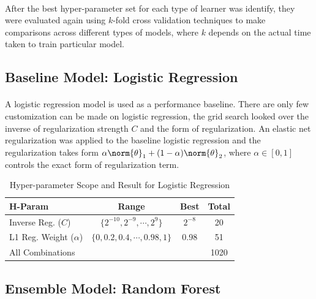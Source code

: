 \documentclass[11pt]{article}
\begin{document}
	 \paragraph{} After the best hyper-parameter set for each type of learner was identify, they were evaluated again using $k$-fold cross validation techniques to make comparisons across different types of models, where $k$ depends on the actual time taken to train particular model.
	
	\subsection{Baseline Model: Logistic Regression}
	\paragraph{} A logistic regression model is used as a performance baseline. There are only few customization can be made on logistic regression, the grid search looked over the inverse of regularization strength $C$ and the form of regularization. An elastic net regularization was applied to the baseline logistic regression and the regularization takes form $\alpha \norm{\theta}_1 + (1 - \alpha) \norm{\theta}_2$, where $\alpha \in [0, 1]$ controls the exact form of regularization term.
	\begin{table}[H]
		\centering
		\begin{tabular}{l|c|c|c}
		H-Param & Range & Best & Total \\
 		\hline
 		Inverse Reg. ($C$) & $\{2^{-10}, 2^{-9}, \cdots, 2^9\}$ & $2^{-8}$ & 20 \\
 		L1 Reg. Weight ($\alpha$) & $\{0, 0.2, 0.4, \cdots, 0.98, 1\}$ & 0.98 & 51 \\
 		\hline
 		All Combinations & & & 1020 
		\end{tabular}
		\caption{Hyper-parameter Scope and Result for Logistic Regression}
	\end{table}
 	
 	\subsection{Ensemble Model: Random Forest}
\end{document}
